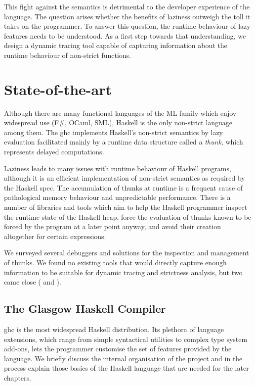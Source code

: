 \documentclass[thesis=B,english]{FITthesis}[2019/12/23]
\begin{document}
This fight against the semantics is detrimental to the developer experience of
the language. The question arises whether the benefits of laziness outweigh the
toll it takes on the programmer. To answer this question, the runtime behaviour
of lazy features needs to be understood. As a first step towards that
understanding, we design a dynamic tracing tool capable of capturing
information about the runtime behaviour of non-strict functions.


\chapter{State-of-the-art} \label{sec:state-of-the-art}
Although there are many functional languages of the ML family which enjoy
widespread use (F\#, OCaml, SML), Haskell is the only non-strict language among
them. The \acrfull{ghc} implements Haskell's non-strict semantics by lazy
evaluation facilitated mainly by a runtime data structure called a
\textit{thunk}, which represents delayed computations.

Laziness leads to many issues with runtime behaviour of Haskell programs,
although it is an efficient implementation of non-strict semantics as required
by the Haskell spec\cite{haskell2010}. The accumulation of thunks at runtime is
a frequent cause of pathological memory behaviour and unpredictable
performance. There is a number of libraries and tools which aim to help the
Haskell programmer inspect the runtime state of the Haskell heap, force the
evaluation of thunks known to be forced by the program at a later point anyway,
and avoid their creation altogether for certain expressions.

We surveyed several debuggers and solutions for the inspection and management
of thunks. We found no existing tools that would directly capture enough
information to be suitable for dynamic tracing and strictness analysis, but two
came close ( and ).


\section{The Glasgow Haskell Compiler} \label{sec:ghc}
\acrshort{ghc} is the most widespread Haskell distribution. Its plethora of
language extensions\cite{ghc-language-extensions}, which range from simple
syntactical utilities to complex type system add-ons, lets the programmer
customise the set of features provided by the language. We briefly discuss the
internal organisation of the project and in the process explain those basics of
the Haskell language that are needed for the later chapters.
\end{document}
